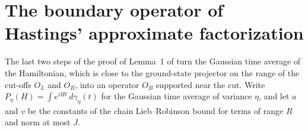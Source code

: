 \section{The boundary operator of Hastings' approximate factorization}
\label{sec:hastings_boundary_factorization}


The last two steps of the proof of Lemma~1 of \cite{Hastings2007AreaLaw} turn
the Gaussian time average of the Hamiltonian, which is close to the
ground-state projector on the range of the cut-offs $O_L$ and $O_R$, into an
operator $O_B$ supported near the cut. Write $P_\eta(H)=\int e^{iHt}\,d\gamma_\eta(t)$
for the Gaussian time average of variance $\eta$, and let $a$ and $v$ be the
constants of the chain Lieb--Robinson bound for terms of range $R$ and norm at
most $J$.

